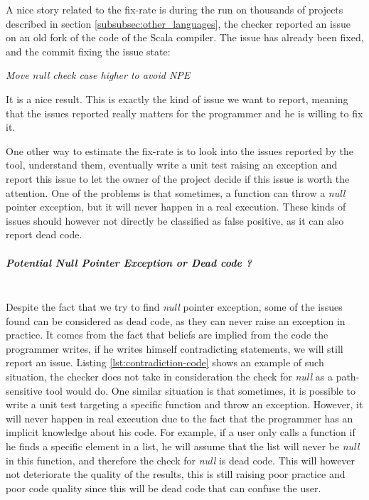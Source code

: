 A nice story related to the fix-rate is during the run on thousands of projects described in section \ref{subsubsec:other_languages}, the checker reported an issue on an old fork of the code of the Scala compiler.
The issue has already been fixed, and the commit fixing the issue state:

\begin{displayquote}
	\centering
	\textit{Move null check case higher to avoid NPE}
\end{displayquote}

It is a nice result. This is exactly the kind of issue we want to report, meaning that the issues reported really matters for the programmer and he is willing to fix it.

One other way to estimate the fix-rate is to look into the issues reported by the tool, understand them, eventually write a unit test raising an exception and report this issue to let the owner of the project decide if this issue is worth the attention.
One of the problems is that sometimes, a function can throw a \emph{null} pointer exception, but it will never happen in a real execution.
These kinds of issues should however not directly be classified as false positive, as it can also report dead code.



\subparagraph{Potential Null Pointer Exception or Dead code ?}\mbox{}\\
\label{subsubsec:dead_code}
Despite the fact that we try to find \emph{null} pointer exception, some of the issues found can be considered as dead code, as they can never raise an exception in practice.
It comes from the fact that beliefs are implied from the code the programmer writes, if he writes himself contradicting statements, we will still report an issue.
Listing \ref{lst:contradiction-code} shows an example of such situation, the checker does not take in consideration the check for \emph{null} as a path-sensitive tool would do. \newline
One similar situation is that sometimes, it is possible to write a unit test targeting a specific function and throw an exception.
However, it will never happen in real execution due to the fact that the programmer has an implicit knowledge about his code. 
For example, if a user only calls a function if he finds a specific element in a list, he will assume that the list will never be \emph{null} in this function, and therefore the check for \emph{null} is dead code. 
This will however not deteriorate the quality of the results, this is still raising poor practice and poor code quality since this will be dead code that can confuse the user.


